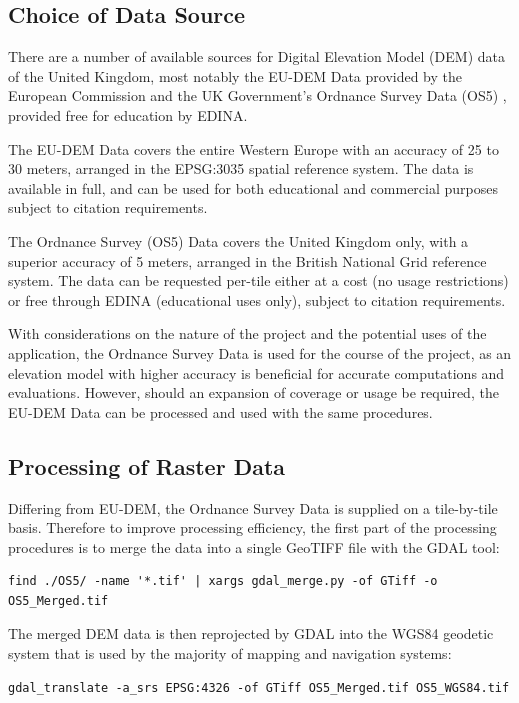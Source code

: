 \documentclass[11pt, oneside]{article}
\begin{document}
	\subsection{Choice of Data Source}
		There are a number of available sources for Digital Elevation Model (DEM) data of the United Kingdom, most notably the EU-DEM Data \cite{eu-dem} provided by the European Commission and the UK Government's Ordnance Survey Data (OS5) \cite{os-5}, provided free for education by EDINA. 
		
		The EU-DEM Data covers the entire Western Europe with an accuracy of 25 to 30 meters, arranged in the EPSG:3035 \cite{epsg-3035} spatial reference system. The data is available in full, and can be used for both educational and commercial purposes subject to citation requirements. 
		
		The Ordnance Survey (OS5) Data covers the United Kingdom only, with a superior accuracy of 5 meters, arranged in the British National Grid \cite{osgb-1936} reference system. The data can be requested per-tile either at a cost (no usage restrictions) or free through EDINA (educational uses only), subject to citation requirements.
		
		With considerations on the nature of the project and the potential uses of the application, the Ordnance Survey Data is used for the course of the project, as an elevation model with higher accuracy is beneficial for accurate computations and evaluations. However, should an expansion of coverage or usage be required, the EU-DEM Data can be processed and used with the same procedures.
		
	\subsection{Processing of Raster Data} \label{subsec:rasterdata}
		Differing from EU-DEM, the Ordnance Survey Data is supplied on a tile-by-tile basis. Therefore to improve processing efficiency, the first part of the processing procedures is to merge the data into a single GeoTIFF \cite{geotiff} file with the GDAL tool:
		\begin{lstlisting}[breaklines]
find ./OS5/ -name '*.tif' | xargs gdal_merge.py -of GTiff -o OS5_Merged.tif 
		\end{lstlisting}
		
		The merged DEM data is then reprojected by GDAL into the WGS84 geodetic system \cite{wgs84} that is used by the majority of mapping and navigation systems:
		\begin{lstlisting}[breaklines]
gdal_translate -a_srs EPSG:4326 -of GTiff OS5_Merged.tif OS5_WGS84.tif
		\end{lstlisting}
		
\end{document}
